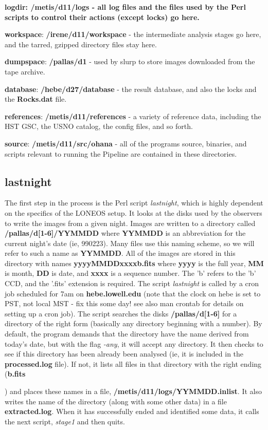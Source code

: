 \documentclass{article}
\newcommand\pr{\em}                   %
\newcommand\ff{\bf}                   %
\begin{document}
{\bf logdir: {\ff /metis/d11/logs} - all log files and the files used
by the Perl scripts to control their actions (except locks) go here.

{\bf workspace}: {\ff /irene/d11/workspace} - the intermediate
analysis stages go here, and the tarred, gzipped directory files stay
here.

{\bf dumpspace}: {\ff /pallas/d1} - used by slurp to store images
downloaded from the tape archive.

{\bf database}: {\ff /hebe/d27/database} - the result database, and
also the locks and the {\ff Rocks.dat} file.

{\bf references}: {\ff /metis/d11/references} - a variety of reference
data, including the HST GSC, the USNO catalog, the config files, and
so forth.

{\bf source}: {\ff /metis/d11/src/ohana} - all of the programs source,
binaries, and scripts relevant to running the Pipeline are contained
in these directories.

\subsection{lastnight}

The first step in the process is the Perl script {\pr lastnight},
which is highly dependent on the specifics of the LONEOS setup.  It
looks at the disks used by the observers to write the images from a
given night.  Images are written to a directory called {\ff
/pallas/d[1-6]/YYMMDD} where {\ff YYMMDD} is an abbreviation for the
current night's date (ie, 990223).  Many files use this naming scheme,
so we will refer to such a name as {\ff YYMMDD}.  All of the images
are stored in this directory with names {\ff yyyyMMDDxxxxb.fits} where
{\ff yyyy} is the full year, {\ff MM} is month, {\ff DD} is date, and
{\ff xxxx} is a sequence number.  The 'b' refers to the 'b' CCD, and
the '.fits' extension is required.  The script {\pr lastnight} is
called by a cron job scheduled for 7am on {\ff hebe.lowell.edu} (note
that the clock on hebe is set to PST, not local MST - fix this some
day!  see also man crontab for details on setting up a cron job).  The
script searches the disks {\ff /pallas/d[1-6]} for a directory of the
right form (basically any directory beginning with a number).  By
default, the program demands that the directory have the name derived
from today's date, but with the flag {\pr -any}, it will accept any
directory.  It then checks to see if this directory has been already
been analysed (ie, it is included in the {\ff processed.log} file).
If not, it lists all files in that directory with the right ending
(\ff b.fits}) and places these names in a file, {\ff
/metis/d11/logs/YYMMDD.inlist}.  It also writes the name of the
directory (along with some other data) in a file {\ff extracted.log}.
When it has successfully ended and identified some data, it calls the
next script, {\pr stage1} and then quits.
\end{document}
